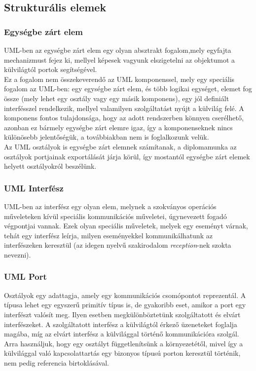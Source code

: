 \documentclass[a4paper,12pt]{report}
\begin{document}
\subsection{Strukturális elemek}
\subsubsection{Egységbe zárt elem} \label{class}
UML-ben az egységbe zárt elem egy olyan absztrakt fogalom,mely egyfajta mechanizmust fejez ki, mellyel képesek vagyunk elszigetelni az objektumot a külvilágtól portok segítségével.\\ Ez a fogalom nem összekeverendő az UML komponenssel, mely egy speciális fogalom az UML-ben: egy egységbe zárt elem, és több logikai egységet, elemet fog össze (mely lehet egy osztály vagy egy másik komponens), egy jól definiált interfésszel rendelkezik, mellyel valamilyen szolgáltatást nyújt a külvilág felé. A komponens fontos tulajdonsága, hogy az adott rendszerben könnyen cserélhető, azonban ez bármely egységbe zárt elemre igaz, így a komponenseknek nincs különösebb jelentőségük, a továbbiakban nem is foglalkozunk velük. \\
Az UML osztályok is egységbe zárt elemnek számítanak, a diplomamunka az osztályok portjainak exportálását járja körül, így mostantól egységbe zárt elemek helyett osztályokról beszélünk.
\subsubsection{UML Interfész}
UML-ben az interfész egy olyan elem, melynek a szokványos operációs műveleteken kívül speciális kommunikációs műveletei, úgynevezett fogadó végpontjai  vannak. Ezek olyan speciális műveletek, melyek egy eseményt várnak, tehát egy interfész leírja, milyen eseményekkel kommunikálhatunk az interfészeken keresztül (az idegen nyelvű szakirodalom \textit{reception}-nek szokta nevezni).
\subsubsection{UML Port}
Osztályok egy adattagja, amely egy kommunikációs csomópontot reprezentál. A típusa lehet egy egyszerű primitív típus is, de gyakoribb eset, amikor a port egy interfészt valósít meg. Ilyen esetben megkülönböztetünk szolgáltatott és elvárt interfészeket. A szolgáltatott interfész a külvilágtól érkező üzeneteket foglalja magába, míg az elvárt interfész a külvilággal történő kommunikációra szolgál. Arra használjuk, hogy egy osztályt függetlenítsünk a környezetétől, mivel így a külvilággal való kapcsolattartás egy bizonyos típusú porton keresztül történik, nem pedig referencia birtoklásával.
\end{document}
